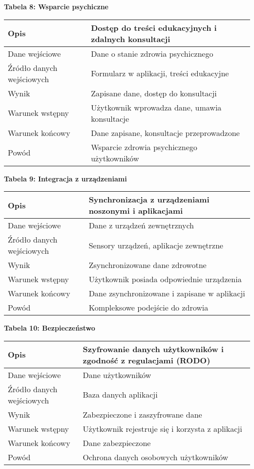 \textbf{Tabela 8: Wsparcie psychiczne}
\begin{table}[h]
  \begin{tabular}{|p{3cm}|p{\dimexpr\textwidth-3cm\relax}|} \hline
    Opis & Dostęp do treści edukacyjnych i zdalnych konsultacji \\\hline
    Dane wejściowe & Dane o stanie zdrowia psychicznego \\\hline
    Źródło danych wejściowych & Formularz w aplikacji, treści edukacyjne \\\hline
    Wynik & Zapisane dane, dostęp do konsultacji \\\hline
    Warunek wstępny & Użytkownik wprowadza dane, umawia konsultacje \\\hline
    Warunek końcowy & Dane zapisane, konsultacje przeprowadzone \\\hline
    Powód & Wsparcie zdrowia psychicznego użytkowników \\\hline
  \end{tabular}
\end{table}

\newpage

\textbf{Tabela 9: Integracja z urządzeniami}
\begin{table}[h]
  \begin{tabular}{|p{3cm}|p{\dimexpr\textwidth-3cm\relax}|} \hline
    Opis & Synchronizacja z urządzeniami noszonymi i aplikacjami \\\hline
    Dane wejściowe & Dane z urządzeń zewnętrznych \\\hline
    Źródło danych wejściowych & Sensory urządzeń, aplikacje zewnętrzne \\\hline
    Wynik & Zsynchronizowane dane zdrowotne \\\hline
    Warunek wstępny & Użytkownik posiada odpowiednie urządzenia \\\hline
    Warunek końcowy & Dane zsynchronizowane i zapisane w aplikacji \\\hline
    Powód & Kompleksowe podejście do zdrowia \\\hline
  \end{tabular}
\end{table}

\textbf{Tabela 10: Bezpieczeństwo}
\begin{table}[h]
  \begin{tabular}{|p{3cm}|p{\dimexpr\textwidth-3cm\relax}|} \hline
    Opis & Szyfrowanie danych użytkowników i zgodność z regulacjami (RODO) \\\hline
    Dane wejściowe & Dane użytkowników \\\hline
    Źródło danych wejściowych & Baza danych aplikacji \\\hline
    Wynik & Zabezpieczone i zaszyfrowane dane \\\hline
    Warunek wstępny & Użytkownik rejestruje się i korzysta z aplikacji \\\hline
    Warunek końcowy & Dane zabezpieczone \\\hline
    Powód & Ochrona danych osobowych użytkowników \\\hline
  \end{tabular}
\end{table}

